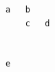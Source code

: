 \documentclass{article}
\begin{document}
\begin{lstlisting}
a   b
	c	d

  
e
\end{lstlisting}
\end{document}
